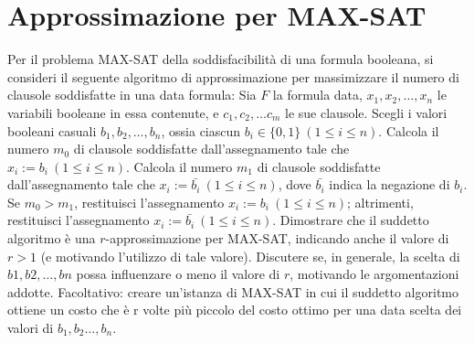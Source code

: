 \chapter{Approssimazione per MAX-SAT}

\begin{problem*}
    Per il problema MAX-SAT della soddisfacibilità di una formula 
    booleana, si consideri il seguente algoritmo di approssimazione 
    per massimizzare il numero di clausole soddisfatte in una data 
    formula: Sia $F$ la formula data, $x_1 , x_2 , \dots , x_n$ le
    variabili booleane in essa contenute, e $c_1 , c_2 , \dots c_m$
    le sue clausole. Scegli i valori booleani casuali $b_1 , b_2 , 
    \dots, b_n$, ossia ciascun $b_i \in \{0, 1\}~(1 \le i \le n)$. 
    Calcola il numero $m_0$ di clausole soddisfatte dall’assegnamento 
    tale che $x_i := b_i~ (1 \le i \le n)$. Calcola il numero $m_1$ di
    clausole soddisfatte dall’assegnamento tale che $x_i := \bar{b_i}~
    (1 \le i \le n)$, dove $\bar{b_i}$ indica la negazione di $b_i$. 
    Se $m_0 > m_1$, restituisci l’assegnamento $x_i := b_i ~(1 \le i 
    \le n)$; altrimenti, restituisci l’assegnamento $x_i := \bar{b_i} 
    ~(1 \le i \le n)$. Dimostrare che il suddetto algoritmo è una 
    $r$-approssimazione per MAX-SAT, indicando anche il valore di $r > 1$
    (e motivando l’utilizzo di tale valore). Discutere se, in generale, 
    la scelta di $b1 , b2 , \dots , bn$ possa influenzare o meno il valore 
    di $r$, motivando le argomentazioni addotte. Facoltativo: creare 
    un’istanza di MAX-SAT in cui il suddetto algoritmo ottiene un costo che 
    è r volte più piccolo del costo ottimo per una data scelta dei valori 
    di $b_1 , b_2 \dots , b_n$.
\end{problem*}
